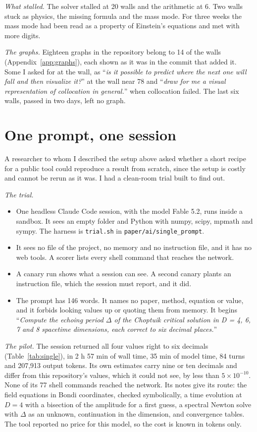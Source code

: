 \documentclass[aps,prd,onecolumn,superscriptaddress,nofootinbib,10pt]{revtex4-2}
\newcommand{\file}[1]{\texttt{#1}}
\newcommand{\prompt}[1]{``\textit{#1}''}
\begin{document}
\emph{What stalled.} The solver stalled at 20 walls and the arithmetic at 6. Two walls stuck as physics, the missing
formula and the mass mode. For three weeks the mass mode had been read as a property of Einstein's equations and met
with more digits.

\emph{The graphs.} Eighteen graphs in the repository belong to 14 of the walls (Appendix~\ref{app:graphs}), each shown
as it was in the commit that added it. Some I asked for at the wall, as \prompt{is it possible to predict where the next
one will fall and then visualize it?} at the wall near 78 and \prompt{draw for me a visual representation of collocation
in general.} when collocation failed. The last six walls, passed in two days, left no graph.

\section{One prompt, one session}
\label{sec:single}

A researcher to whom I described the setup above asked whether a short recipe for a public tool could reproduce a
result from scratch, since the setup is costly and cannot be rerun as it was. I had a clean-room trial built to find
out.

\emph{The trial.}
\begin{itemize}
\item One headless Claude Code session, with the model Fable 5.2, runs inside a sandbox. It sees an empty folder and
Python with numpy, scipy, mpmath and sympy. The harness is \file{trial.sh} in \file{paper/ai/single\_prompt}.
\item It sees no file of the project, no memory and no instruction file, and it has no web tools. A scorer lists every
shell command that reaches the network.
\item A canary run shows what a session can see. A second canary plants an instruction file, which the session must
report, and it did.
\item The prompt has 146 words. It names no paper, method, equation or value, and it forbids looking values up or
quoting them from memory. It begins \prompt{Compute the echoing period $\Delta$ of the Choptuik critical solution in
D = 4, 6, 7 and 8 spacetime dimensions, each correct to six decimal places.}
\end{itemize}

\emph{The pilot.} The session returned all four values right to six decimals (Table~\ref{tab:single}), in 2 h 57 min of
wall time, 35 min of model time, 84 turns and 207,913 output tokens. Its own estimates carry nine or ten decimals and
differ from this repository's values, which it could not see, by less than $5\times10^{-10}$. None of its 77 shell
commands reached the network. Its notes give its route: the field equations in Bondi coordinates, checked symbolically,
a time evolution at $D = 4$ with a bisection of the amplitude for a first guess, a spectral Newton solve with $\Delta$
as an unknown, continuation in the dimension, and convergence tables. The tool reported no price for this model, so the
cost is known in tokens only.
\end{document}
